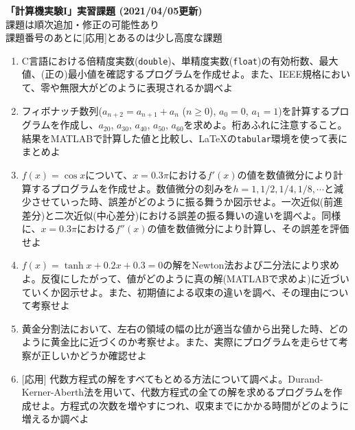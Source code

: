 \documentclass[11pt]{jarticle}
\begin{document}
\noindent
{\bf\large 「計算機実験I」実習課題 (2021/04/05更新)}
\\[-0.5em]

\noindent
課題は順次追加・修正の可能性あり\\[-0.5em]

\noindent
課題番号のあとに[応用]とあるのは少し高度な課題\\[-0.5em]

\begin{enumerate}
\renewcommand{\labelenumi}{1-\arabic{enumi})}

\item C言語における倍精度実数({\tt double})、単精度実数({\tt float})の有効桁数、最大値、(正の)最小値を確認するプログラムを作成せよ。また、IEEE規格において、零や無限大がどのように表現されるか調べよ
  
\item フィボナッチ数列($a_{n+2}=a_{n+1}+a_n$ ($n \ge 0$), $a_0=0$, $a_1=1$)を計算するプログラムを作成し、$a_{20}$, $a_{30}$, $a_{40}$, $a_{50}$, $a_{60}$を求めよ。桁あふれに注意すること。結果をMATLABで計算した値と比較し、\LaTeX の{\tt tabular}環境を使って表にまとめよ
  
\item $f(x)=\cos x$について、$x=0.3\pi$における$f'(x)$の値を数値微分により計算するプログラムを作成せよ。数値微分の刻みを$h=1,1/2,1/4,1/8,\cdots$と減少させていった時、誤差がどのように振る舞うか図示せよ。一次近似(前進差分)と二次近似(中心差分)における誤差の振る舞いの違いを調べよ。同様に、$x=0.3\pi$における$f''(x)$の値を数値微分により計算し、その誤差を評価せよ
  
\item $f(x)=\tanh x + 0.2 x + 0.3 = 0$の解をNewton法および二分法により求めよ。反復にしたがって、値がどのように真の解(MATLABで求めよ)に近づいていくか図示せよ。また、初期値による収束の違いを調べ、その理由について考察せよ
  
\item 黄金分割法において、左右の領域の幅の比が適当な値から出発した時、どのように黄金比に近づくのか考察せよ。また、実際にプログラムを走らせて考察が正しいかどうか確認せよ

\item \mbox{} [応用] 代数方程式の解をすべてもとめる方法について調べよ。Durand-Kerner-Aberth法を用いて、代数方程式の全ての解を求めるプログラムを作成せよ。方程式の次数を増やすにつれ、収束までにかかる時間がどのように増えるか調べよ

\end{enumerate}
\end{document}
